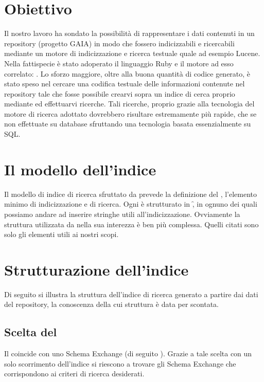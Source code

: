\section*{Obiettivo}
Il nostro lavoro ha sondato la possibilità di rappresentare i dati contenuti in un repository (progetto GAIA) in modo che fossero indicizzabili e ricercabili mediante un motore di indicizzazione e ricerca testuale quale ad esempio Lucene. Nella fattispecie è stato adoperato il linguaggio Ruby e il motore ad esso correlato: \fer. Lo sforzo maggiore, oltre alla buona quantità di codice generato, è stato speso nel cercare una codifica testuale delle informazioni contenute nel repository tale che fosse possibile crearvi sopra un indice di cerca proprio mediante \fer ed effettuarvi ricerche. Tali ricerche, proprio grazie alla tecnologia del motore di ricerca adottato dovrebbero risultare estremamente più rapide, che se non effettuate su database sfruttando una tecnologia basata essenzialmente su SQL.  
\section*{Il modello dell'indice}
Il modello di indice di ricerca sfruttato da \fer prevede la definizione del \doc, l'elemento minimo di indicizzazione e di ricerca. Ogni \doc è strutturato in \f, in ognuno dei quali possiamo andare ad inserire stringhe utili all'indicizzazione. Ovviamente la struttura utilizzata da \fer nella sua interezza è ben più complessa. Quelli citati sono solo gli elementi utili ai nostri scopi.
\section*{Strutturazione dell'indice}
Di seguito si illustra la struttura dell'indice di ricerca generato a partire dai dati del repository, la conoscenza della cui struttura è data per scontata.

\subsection*{Scelta del \doc}
\noindent Il \doc coincide con uno Schema Exchange (di seguito  \se). Grazie a tale scelta con un solo scorrimento dell'indice si riescono a trovare gli Schema Exchange che corrispondono ai criteri di ricerca desiderati.

